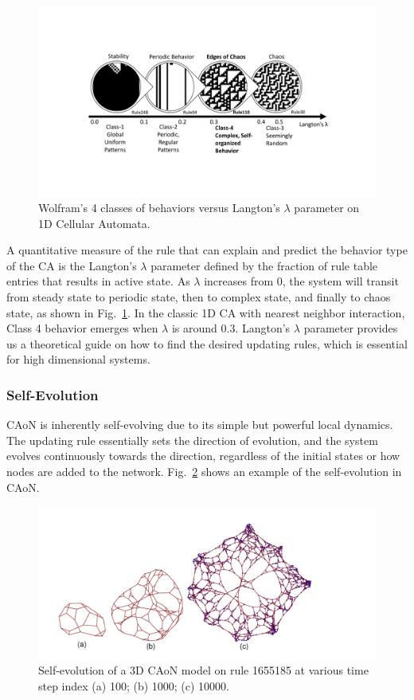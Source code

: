 \documentclass[reprint,pre,aps]{revtex4-1}
\begin{document}
\begin{figure}[!htp]
\centering
\includegraphics[width=\linewidth]{fig/ca_classes_lambda}
\caption{Wolfram's 4 classes of behaviors versus Langton's $\lambda$ parameter on 1D Cellular Automata.}
\label{fig:ca_classes_lambda}
\end{figure}

A quantitative measure of the rule that can explain and predict the behavior type of the CA is the Langton's $\lambda$ parameter defined by the fraction of rule table entries that results in active state. As $\lambda$ increases from 0, the system will transit from steady state to periodic state, then to complex state, and finally to chaos state, as shown in Fig.~\ref{fig:ca_classes_lambda}. In the classic 1D CA with nearest neighbor interaction, Class 4 behavior emerges when $\lambda$ is around 0.3. Langton's $\lambda$ parameter provides us a theoretical guide on how to find the desired updating rules, which is essential for high dimensional systems.

\subsubsection{Self-Evolution}

CAoN is inherently self-evolving due to its simple but powerful local dynamics. The updating rule essentially sets the direction of evolution, and the system evolves continuously towards the direction, regardless of the initial states or how nodes are added to the network. Fig.~\ref{fig:ca_evolution} shows an example of the self-evolution in CAoN.

\begin{figure}[!htbp]
\centering
\includegraphics[width=0.9\linewidth]{fig/ca_evolution}
\caption{Self-evolution of a 3D CAoN model on rule 1655185 at various time step index (a) 100; (b) 1000; (c) 10000.}
\label{fig:ca_evolution}
\end{figure}
\end{document}
